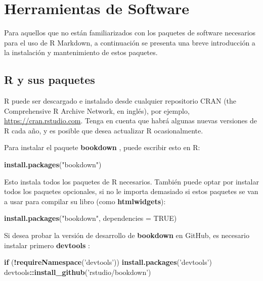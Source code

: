 \documentclass[12pt,]{krantz}
\makeatletter
\newenvironment{Shaded}{\begin{snugshade}}{\end{snugshade}}
\newcommand{\KeywordTok}[1]{\textcolor[rgb]{0.13,0.29,0.53}{\textbf{#1}}}
\newcommand{\DataTypeTok}[1]{\textcolor[rgb]{0.13,0.29,0.53}{#1}}
\newcommand{\StringTok}[1]{\textcolor[rgb]{0.31,0.60,0.02}{#1}}
\newcommand{\OtherTok}[1]{\textcolor[rgb]{0.56,0.35,0.01}{#1}}
\newcommand{\ControlFlowTok}[1]{\textcolor[rgb]{0.13,0.29,0.53}{\textbf{#1}}}
\newcommand{\OperatorTok}[1]{\textcolor[rgb]{0.81,0.36,0.00}{\textbf{#1}}}
\newcommand{\NormalTok}[1]{#1}
\newenvironment{kframe}{%
\medskip{}
\setlength{\fboxsep}{.8em}
 \def\at@end@of@kframe{}%
 \ifinner\ifhmode%
  \def\at@end@of@kframe{\end{minipage}}%
  \begin{minipage}{\columnwidth}%
 \fi\fi%
 \def\FrameCommand##1{\hskip\@totalleftmargin \hskip-\fboxsep
 \colorbox{shadecolor}{##1}\hskip-\fboxsep
     \hskip-\linewidth \hskip-\@totalleftmargin \hskip\columnwidth}%
 \MakeFramed {\advance\hsize-\width
   \@totalleftmargin\z@ \linewidth\hsize
   \@setminipage}}%
 {\par\unskip\endMakeFramed%
 \at@end@of@kframe}
\renewenvironment{Shaded}{\begin{kframe}}{\end{kframe}}
\theoremstyle{definition}
\theoremstyle{definition}
\theoremstyle{definition}
\theoremstyle{remark}
\makeatother
\begin{document}
\cleardoublepage 

\appendix {}


\chapter{Herramientas de Software}\label{herramientas-de-software}

Para aquellos que no están familiarizados con los paquetes de software
necesarios para el uso de R Markdown, a continuación se presenta una
breve introducción a la instalación y mantenimiento de estos paquetes.

\section{R y sus paquetes}\label{r-y-sus-paquetes}

R puede ser descargado e instalado desde cualquier repositorio CRAN (the
Comprehensive R Archive Network, en inglés), por ejemplo,
\url{https://cran.rstudio.com}. Tenga en cuenta que habrá algunas nuevas
versiones de R cada año, y es posible que desea actualizar R
ocasionalmente.

Para instalar el paquete \textbf{bookdown} , puede escribir esto en R:

\begin{Shaded}
\begin{Highlighting}[]
\KeywordTok{install.packages}\NormalTok{(}\StringTok{"bookdown"}\NormalTok{)}
\end{Highlighting}
\end{Shaded}

Esto instala todos los paquetes de R necesarios. También puede optar por
instalar todos los paquetes opcionales, si no le importa demasiado si
estos paquetes se van a usar para compilar su libro (como
\textbf{htmlwidgets}):

\begin{Shaded}
\begin{Highlighting}[]
\KeywordTok{install.packages}\NormalTok{(}\StringTok{"bookdown"}\NormalTok{, }\DataTypeTok{dependencies =} \OtherTok{TRUE}\NormalTok{)}
\end{Highlighting}
\end{Shaded}

Si desea probar la versión de desarrollo de \textbf{bookdown} en GitHub,
es necesario instalar primero \textbf{devtools} :

\begin{Shaded}
\begin{Highlighting}[]
\ControlFlowTok{if}\NormalTok{ (}\OperatorTok{!}\KeywordTok{requireNamespace}\NormalTok{(}\StringTok{'devtools'}\NormalTok{)) }\KeywordTok{install.packages}\NormalTok{(}\StringTok{'devtools'}\NormalTok{)}
\NormalTok{devtools}\OperatorTok{::}\KeywordTok{install_github}\NormalTok{(}\StringTok{'rstudio/bookdown'}\NormalTok{)}
\end{Highlighting}
\end{Shaded}
\end{document}
